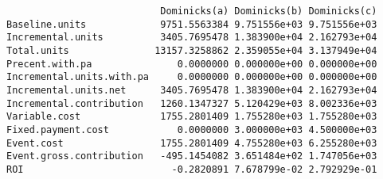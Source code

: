 \documentclass[]{article}
\newenvironment{Shaded}{\begin{snugshade}}{\end{snugshade}}
\newcommand{\CommentTok}[1]{\textcolor[rgb]{0.56,0.35,0.01}{\textit{#1}}}
\newcommand{\DataTypeTok}[1]{\textcolor[rgb]{0.13,0.29,0.53}{#1}}
\newcommand{\DecValTok}[1]{\textcolor[rgb]{0.00,0.00,0.81}{#1}}
\newcommand{\FloatTok}[1]{\textcolor[rgb]{0.00,0.00,0.81}{#1}}
\newcommand{\KeywordTok}[1]{\textcolor[rgb]{0.13,0.29,0.53}{\textbf{#1}}}
\newcommand{\NormalTok}[1]{#1}
\newcommand{\StringTok}[1]{\textcolor[rgb]{0.31,0.60,0.02}{#1}}
\begin{document}
\begin{verbatim}
                           Dominicks(a) Dominicks(b) Dominicks(c)
Baseline.units             9751.5563384 9.751556e+03 9.751556e+03
Incremental.units          3405.7695478 1.383900e+04 2.162793e+04
Total.units               13157.3258862 2.359055e+04 3.137949e+04
Precent.with.pa               0.0000000 0.000000e+00 0.000000e+00
Incremental.units.with.pa     0.0000000 0.000000e+00 0.000000e+00
Incremental.units.net      3405.7695478 1.383900e+04 2.162793e+04
Incremental.contribution   1260.1347327 5.120429e+03 8.002336e+03
Variable.cost              1755.2801409 1.755280e+03 1.755280e+03
Fixed.payment.cost            0.0000000 3.000000e+03 4.500000e+03
Event.cost                 1755.2801409 4.755280e+03 6.255280e+03
Event.gross.contribution   -495.1454082 3.651484e+02 1.747056e+03
ROI                          -0.2820891 7.678799e-02 2.792929e-01
\end{verbatim}

\begin{Shaded}
\end{Shaded}
\end{document}
